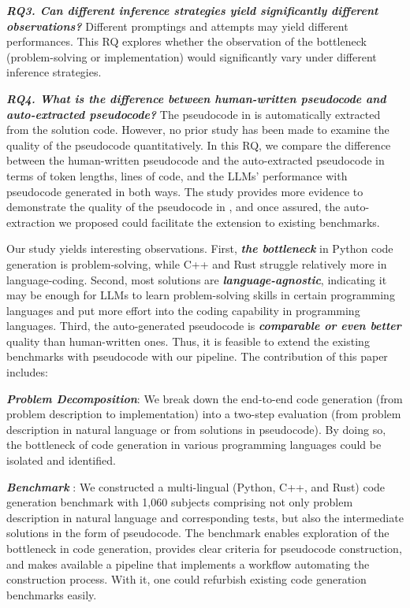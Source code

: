 \textit{\textbf{RQ3. Can different inference strategies yield significantly different observations?}} Different promptings and attempts may yield different performances. This RQ explores whether the observation of the bottleneck (problem-solving or implementation) would significantly vary under different inference strategies. 


\textbf{\textit{RQ4. What is the difference between human-written pseudocode and auto-extracted pseudocode?}} The pseudocode in \name is automatically extracted from the solution code. However, no prior study has been made to examine the quality of the pseudocode quantitatively. In this RQ, we compare the difference between the human-written pseudocode and the auto-extracted pseudocode in terms of token lengths, lines of code, and the LLMs' performance with pseudocode generated in both ways. The study provides more evidence to demonstrate the quality of the pseudocode in \name, and once assured, the auto-extraction we proposed could facilitate the extension to existing benchmarks. 




Our study yields interesting observations. First, \textbf{\textit{the bottleneck}} in Python code generation is problem-solving, while C++ and Rust struggle relatively more in language-coding. Second, most solutions are \textbf{\textit{language-agnostic}}, indicating it may be enough for LLMs to learn problem-solving skills in certain programming languages and put more effort into the coding capability in programming languages. Third, the auto-generated pseudocode is \textbf{\textit{comparable or even better}} quality than human-written ones. Thus, it is feasible to extend the existing benchmarks with pseudocode with our pipeline. The contribution of this paper includes:

{\footnotesize {}} \textbf{\textit{Problem Decomposition}}: We break down the end-to-end code generation (from problem description to implementation) into a two-step evaluation (from problem description in natural language or from solutions in pseudocode). By doing so, the bottleneck of code generation in various programming languages could be isolated and identified.

{\footnotesize {}} \textit{\textbf{Benchmark \name}}: We constructed a multi-lingual (Python, C++, and Rust) code generation benchmark with 1,060 subjects comprising not only problem description in natural language and corresponding tests, but also the intermediate solutions in the form of pseudocode. The benchmark enables exploration of the bottleneck in code generation, provides clear criteria for pseudocode construction, and makes available a pipeline that implements a workflow automating the construction process. With it, one could refurbish existing code generation benchmarks easily. 

